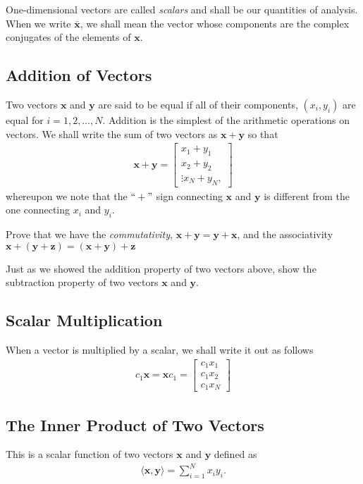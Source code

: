 One-dimensional vectors are called \textit{scalars} and shall be our quantities of analysis. When we write $\bar{\bm{x}}$, we shall mean the vector whose components are the complex conjugates of the elements of $\bm{x}$.

\subsection{Addition of Vectors}
%
Two vectors $\bm{x}$ and $\bm{y}$ are said to be equal if all of their components, $(x_i, y_i)$ are equal for $i=1,2,\ldots, N$. Addition is the simplest of the arithmetic operations on vectors. We shall write the sum of two vectors as $\bm{x} + \bm{y}$ so that 
%
\begin{align}
	\bm{x} + \bm{y} = \begin{bmatrix}
	x_1 + y_1 \\ x_2+y_2 \\ \vdots x_N + y_N,
	\end{bmatrix}
\end{align}
% 
whereupon we note that the $``+"$ sign connecting $\bm{x}$ and $\bm{y}$ is different from the one connecting $x_i$ and $y_i$.

\begin{homework}
	Prove that we have the \textit{commutativity}, $\bm{x}+\bm{y} = \bm{y} + \bm{x}$, and the associativity $\bm{x} + \left(\bm{y}+\bm{z}\right) = \left(\bm{x} + \bm{y}\right)+\bm{z}$
\end{homework}
%
\begin{homework}
	Just as we showed the addition property of two vectors above, show the subtraction property of two vectors $\bm{x}$ and $\bm{y}$.
\end{homework}

\subsection{Scalar Multiplication}
When a vector is multiplied by a scalar, we shall write it out as follows
%
\begin{align}
	c_1 \bm{x} = \bm{x} c_1 = \begin{bmatrix}
	c_1 x_1 \\ c_1 x_2 \\ c_1 x_N
	\end{bmatrix}
\end{align}
%
\subsection{The Inner Product of Two Vectors}
%
This is a scalar function of two vectors $\bm{x}$ and $\bm{y}$ defined as 
%
\begin{align}
	\langle \bm{x}, \bm{y} \rangle = \sum_{i=1}^{N} x_i y_i.
\end{align}

